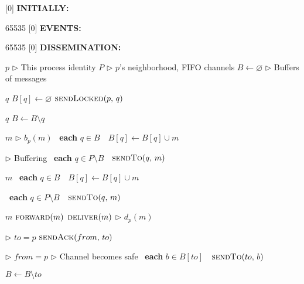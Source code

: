 
[0] {\textbf{INITIALLY:}}

{65535}{}
[0] {\textbf{EVENTS:}}

{65535}{}
[0] {\textbf{DISSEMINATION:}}


\newcommand{\comment}[1]{$\rhd$ #1}
\newcommand{\LINEIFTHEN}[2]{%
  \algorithmicif\ {#1}\ \algorithmicthen\ {#2} %
}
\newcommand{\LINEIFTHENELSE}[3]{%
  \algorithmicif\ {#1}\ \algorithmicthen\ {#2} \algorithmicelse\ {#3}%
}

\newcommand{\LINEFOR}[2]{%
  \algorithmicfor\ {#1}\ \algorithmicdo\ {#2} %
}

\begin{algorithmic}[1]
\small
  \initially
  \State $p$ \hfill \comment{This process identity}
  \State $P$
  \hfill \comment{$p$'s neighborhood, FIFO channels}
  \State $B \leftarrow \varnothing$ 
  \hfill \comment{Buffers of messages}
  \endInitially
  
  \event
   {$q$}
  \State $B[q] \leftarrow \varnothing$
  \State $\textsc{sendLocked}(p,\, q)$
  \EndIf
  \EndFunction
  
  \Statex

   {$q$}
  \State $B \leftarrow B \setminus q$
  \EndFunction

  \endEvent

  \dissemination

   {$m$}
  \hfill \comment{$b_p(m)$}
  \State \LINEFOR{\textbf{each} $q \in B$}
  {$B[q] \leftarrow B[q] \cup m$}
  \hfill \comment{Buffering}%
  \State \LINEFOR{\textbf{each} $q \in P \setminus B$} 
  {$\textsc{sendTo}(q,\, m)$}
  \EndFunction

  \Statex
  
   {$m$}
  \State \LINEFOR{\textbf{each} $q \in B$}
  {$B[q] \leftarrow B[q] \cup m$}
  \State \LINEFOR{\textbf{each} $q \in P \setminus B$} 
  {$\textsc{sendTo}(q,\, m)$}
  \EndFunction

  \Statex

   {$m$}
  \State $\textsc{forward}(m)$
  \State $\textsc{deliver}(m)$ \hfill \comment{$d_p(m)$}
  \EndIf
  \EndFunction

  \Statex

   \hfill \comment{$to=p$}  
  \State $\textsc{sendAck}(from,\, to)$
  \EndFunction
  
  \Statex

   \hfill \comment{$from=p$}
   \hfill \comment{Channel becomes safe}
  \State \LINEFOR {\textbf{each} $b \in B[to]$}
  {$\textsc{sendTo}(to,\, b)$}
  \State $B \leftarrow B \setminus to$
  \EndIf
  \EndFunction

\end{algorithmic}


